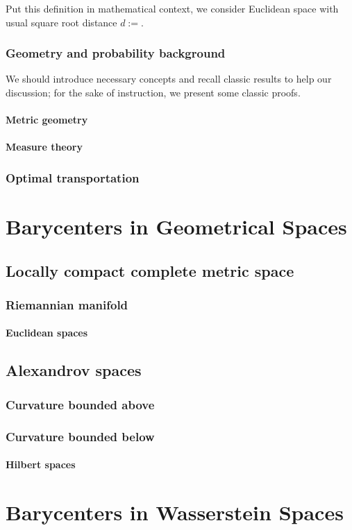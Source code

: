 \documentclass{report}
\begin{document}
Put this definition in mathematical context, we consider Euclidean space with usual square root distance $d:=$.

\section{Geometry and probability background}
We should introduce necessary concepts and recall classic results to help our discussion; for the sake of instruction, we present some classic proofs.
\subsection{Metric geometry}
\subsection{Measure theory}

\section{Optimal transportation}

\part{Barycenters in Geometrical Spaces}

\chapter{Locally compact complete metric space}

\section{Riemannian manifold}
\subsection{Euclidean spaces}

\chapter{Alexandrov spaces}
\section{Curvature bounded above}
\section{Curvature bounded below}
\subsection{Hilbert spaces}

\part{Barycenters in Wasserstein Spaces}

\printbibliography
\end{document}
